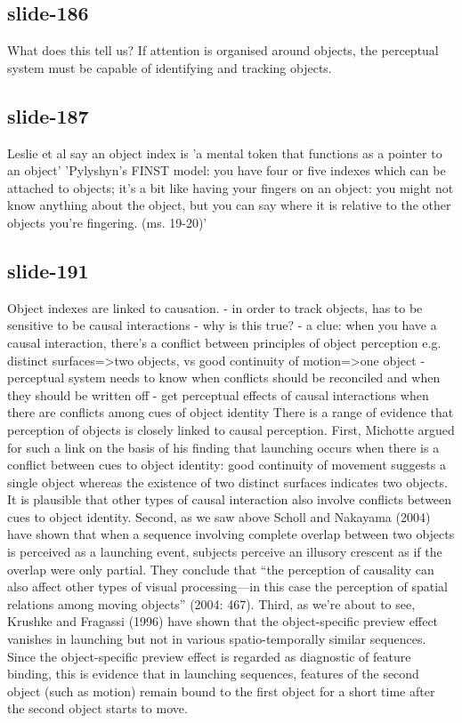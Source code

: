\documentclass[12pt,\papersize]{extarticle}
\begin{document}
 
\subsection{slide-186}
What does this tell us?
If attention is organised around objects, the perceptual system must be capable of identifying and tracking objects.
 
 
\subsection{slide-187}
Leslie et al say an object index is 'a mental token that functions as a pointer to an object' \citep[p.\ 11]{Leslie:1998zk}
'Pylyshyn's FINST model: you have four or five indexes which can be attached to objects; it's a bit like having your fingers on an object: you might not know anything about the object, but you can say where it is relative to the other objects you're fingering. (ms. 19-20)' \citep{Scholl:1999mi}
 
 
\subsection{slide-191}
Object indexes are linked to causation.
- in order to track objects, has to be sensitive to be causal interactions
- why is this true?
- a clue: when you have a causal interaction, there's a conflict between principles of object perception e.g. distinct surfaces=>two objects, vs good continuity of motion=>one object
- perceptual system needs to know when conflicts should be reconciled and when they should be written off
- get perceptual effects of causal interactions when there are conflicts among cues of object identity
There is a range of evidence that perception of objects is closely linked to causal perception.
First, Michotte argued for such a link on the basis of his finding that launching occurs when there is a conflict between cues to object identity: good continuity of movement suggests a single object whereas the existence of two distinct surfaces indicates two objects.
It is plausible that other types of causal interaction also involve conflicts between cues to object identity.
Second, as we saw above Scholl and Nakayama (2004) have shown that when a sequence involving complete overlap between two objects is perceived as a launching event, subjects perceive an illusory crescent as if the overlap were only partial. They conclude that “the perception of causality can also affect other types of visual processing—in this case the perception of spatial relations among moving objects” (2004: 467).
Third, as we're about to see, Krushke and Fragassi (1996) have shown that the object-specific preview effect vanishes in launching but not in various spatio-temporally similar sequences. Since the object-specific preview effect is regarded as diagnostic of feature binding, this is evidence that in launching sequences, features of the second object (such as motion) remain bound to the first object for a short time after the second object starts to move.
 
\end{document}
